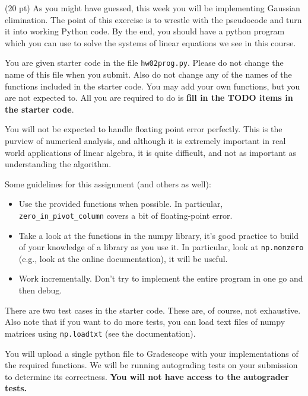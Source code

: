 \documentclass{article}
\theoremstyle{remark}
\begin{document}
(20 pt) As you might have guessed, this week you will be implementing Gaussian elimination.
The point of this exercise is to wrestle with the pseudocode and turn it into working Python code.
By the end, you should have a python program which you can use to solve the systems of linear equations we see in this course.

You are given starter code in the file \texttt{hw02prog.py}.
Please do not change the name of this file when you submit.
Also do not change any of the names of the functions included in the starter code.
You may add your own functions, but you are not expected to.
All you are required to do is \textbf{fill in the TODO items in the starter code}.

You will not be expected to handle floating point error perfectly.
This is the purview of numerical analysis, and although it is extremely important in real world applications of linear algebra, it is quite difficult, and not as important as understanding the algorithm.

Some guidelines for this assignment (and others as well):
\begin{itemize}
\item Use the provided functions when possible. In particular, \texttt{zero\_in\_pivot\_column} covers a bit of floating-point error.
\item Take a look at the functions in the numpy library, it's good practice to build of your knowledge of a library as you use it.
  In particular, look at \texttt{np.nonzero} (e.g., look at the online documentation), it will be useful.
\item Work incrementally. Don't try to implement the entire program in one go and then debug.
\end{itemize}
There are two test cases in the starter code.
These are, of course, not exhaustive.
Also note that if you want to do more tests, you can load text files of numpy matrices using \texttt{np.loadtxt} (see the documentation).

You will upload a single python file to Gradescope with your implementations of the required functions.
We will be running autograding tests on your submission to determine its correctness.
\textbf{You will not have access to the autograder tests.}
\end{document}
